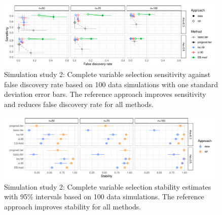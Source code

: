 \documentclass[a4]{article}
\theoremstyle{definition}
\begin{document}
\begin{figure}[tp]
  \centering
  \includegraphics[width=0.98\textwidth]{graphics/sensitivity_vs_fdr_iterated.pdf}
  \vspace{-0.3\baselineskip}
  \caption{Simulation study 2: Complete variable selection sensitivity against false discovery rate based on 100 data simulations with one standard deviation error bars. The reference approach improves sensitivity and reduces false discovery rate for all methods.}
  \label{fig:sensitivity_vs_fdr_iterated}
\end{figure}
\begin{figure}[tp]
  \centering
  \includegraphics[width=0.98\textwidth]{graphics/stability_iterated.pdf}
  \vspace{-0.3\baselineskip}
  \caption{Simulation study 2: Complete variable selection stability estimates with 95\% intervals based on 100 data simulations. The reference approach improves stability for all methods.}
  \label{fig:stability_iterated}
\end{figure}
\end{document}
